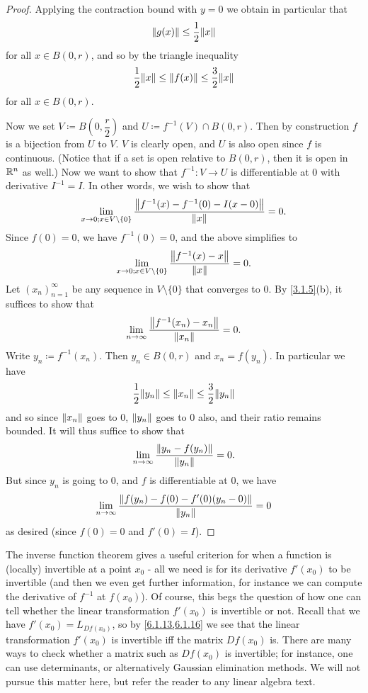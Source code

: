 \begin{proof}
  Applying the contraction bound with \(y = 0\) we obtain in particular that
  \[
    \norm*{g(x)} \leq \dfrac{1}{2} \norm*{x}
  \]
  for all \(x \in B(0, r)\), and so by the triangle inequality
  \[
    \dfrac{1}{2} \norm*{x} \leq \norm*{f(x)} \leq \dfrac{3}{2} \norm*{x}
  \]
  for all \(x \in B(0, r)\).

  Now we set \(V \coloneqq B(0, \dfrac{r}{2})\) and \(U \coloneqq f^{-1}(V) \cap B(0, r)\).
  Then by construction \(f\) is a bijection from \(U\) to \(V\).
  \(V\) is clearly open, and \(U\) is also open since \(f\) is continuous.
  (Notice that if a set is open relative to \(B(0, r)\), then it is open in \(\R^n\) as well.)
  Now we want to show that \(f^{-1} : V \to U\) is differentiable at \(0\) with derivative \(I^{-1} = I\).
  In other words, we wish to show that
  \[
    \lim_{x \to 0 ; x \in V \setminus \{0\}} \dfrac{\norm*{f^{-1}(x) - f^{-1}(0) - I(x - 0)}}{\norm*{x}} = 0.
  \]
  Since \(f(0) = 0\), we have \(f^{-1}(0) = 0\), and the above simplifies to
  \[
    \lim_{x \to 0 ; x \in V \setminus \{0\}} \dfrac{\norm*{f^{-1}(x) - x}}{\norm*{x}} = 0.
  \]
  Let \((x_n)_{n = 1}^\infty\) be any sequence in \(V \setminus \{0\}\) that converges to \(0\).
  By \cref{3.1.5}(b), it suffices to show that
  \[
    \lim_{n \to \infty} \dfrac{\norm*{f^{-1}(x_n) - x_n}}{\norm*{x_n}} = 0.
  \]
  Write \(y_n \coloneqq f^{-1}(x_n)\).
  Then \(y_n \in B(0, r)\) and \(x_n = f(y_n)\).
  In particular we have
  \[
    \dfrac{1}{2} \norm*{y_n} \leq \norm*{x_n} \leq \dfrac{3}{2} \norm*{y_n}
  \]
  and so since \(\norm*{x_n}\) goes to \(0\), \(\norm*{y_n}\) goes to \(0\) also, and their ratio remains bounded.
  It will thus suffice to show that
  \[
    \lim_{n \to \infty} \dfrac{\norm*{y_n - f(y_n)}}{\norm*{y_n}} = 0.
  \]
  But since \(y_n\) is going to \(0\), and \(f\) is differentiable at \(0\), we have
  \[
    \lim_{n \to \infty} \dfrac{\norm*{f(y_n) - f(0) - f'(0)(y_n - 0)}}{\norm*{y_n}} = 0
  \]
  as desired (since \(f(0) = 0\) and \(f'(0) = I\)).
\end{proof}

\begin{note}
  The inverse function theorem gives a useful criterion for when a function is (locally) invertible at a point \(x_0\)
  - all we need is for its derivative \(f'(x_0)\) to be invertible
  (and then we even get further information, for instance we can compute the derivative of \(f^{-1}\) at \(f(x_0)\)).
  Of course, this begs the question of how one can tell whether the linear transformation \(f'(x_0)\) is invertible or not.
  Recall that we have \(f'(x_0) = L_{D f(x_0)}\), so by \cref{6.1.13,6.1.16} we see that the linear transformation \(f'(x_0)\) is invertible iff the matrix \(D f(x_0)\) is.
  There are many ways to check whether a matrix such as \(D f(x_0)\) is invertible;
  for instance, one can use determinants, or alternatively Gaussian elimination methods.
  We will not pursue this matter here, but refer the reader to any linear algebra text.
\end{note}

